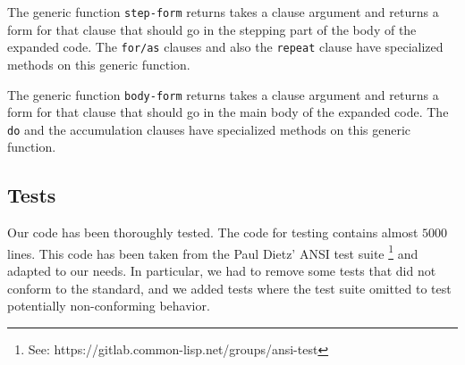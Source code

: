 The generic function \texttt{step-form} returns takes a clause
argument and returns a form for that clause that should go in the
stepping part of the body of the expanded code.  The \texttt{for/as}
clauses and also the \texttt{repeat} clause have specialized methods
on this generic function.

The generic function \texttt{body-form} returns takes a clause
argument and returns a form for that clause that should go in the main
body of the expanded code.  The \texttt{do} and the accumulation
clauses have specialized methods on this generic function.

\subsection{Tests}
\label{sec-our-technique-tests}

Our code has been thoroughly tested.  The code for testing contains
almost $5000$ lines.  This code has been taken from the Paul Dietz'
ANSI test suite%
\footnote{See: https://gitlab.common-lisp.net/groups/ansi-test}
and adapted to our needs.  In particular, we had to remove some tests
that did not conform to the standard, and we added tests where the
test suite omitted to test potentially non-conforming behavior.
